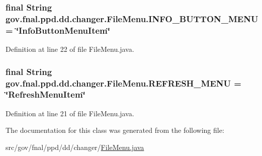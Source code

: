 \hypertarget{classgov_1_1fnal_1_1ppd_1_1dd_1_1changer_1_1FileMenu_abce65935f1c446474f9a3c9c332a8210}{
\subsubsection[{I\-N\-F\-O\-\_\-\-B\-U\-T\-T\-O\-N\-\_\-\-M\-E\-N\-U}]{\setlength{\rightskip}{0pt plus 5cm}final String gov.\-fnal.\-ppd.\-dd.\-changer.\-File\-Menu.\-I\-N\-F\-O\-\_\-\-B\-U\-T\-T\-O\-N\-\_\-\-M\-E\-N\-U = \char`\"{}Info\-Button\-Menu\-Item\char`\"{}\hspace{0.3cm}{\ttfamily [static]}}}\label{classgov_1_1fnal_1_1ppd_1_1dd_1_1changer_1_1FileMenu_abce65935f1c446474f9a3c9c332a8210}


Definition at line 22 of file File\-Menu.\-java.

\hypertarget{classgov_1_1fnal_1_1ppd_1_1dd_1_1changer_1_1FileMenu_ae6c6477bb6dcf6f725fba6d32aefc3ee}{
\subsubsection[{R\-E\-F\-R\-E\-S\-H\-\_\-\-M\-E\-N\-U}]{\setlength{\rightskip}{0pt plus 5cm}final String gov.\-fnal.\-ppd.\-dd.\-changer.\-File\-Menu.\-R\-E\-F\-R\-E\-S\-H\-\_\-\-M\-E\-N\-U = \char`\"{}Refresh\-Menu\-Item\char`\"{}\hspace{0.3cm}{\ttfamily [static]}}}\label{classgov_1_1fnal_1_1ppd_1_1dd_1_1changer_1_1FileMenu_ae6c6477bb6dcf6f725fba6d32aefc3ee}


Definition at line 21 of file File\-Menu.\-java.



The documentation for this class was generated from the following file\-:\begin{DoxyCompactItemize}
\item 
src/gov/fnal/ppd/dd/changer/\hyperlink{FileMenu_8java}{File\-Menu.\-java}\end{DoxyCompactItemize}
